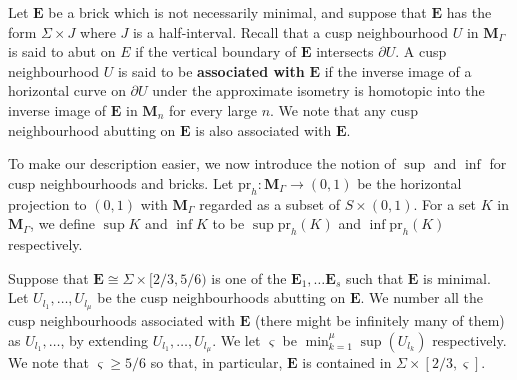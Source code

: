 \documentclass{amsart}
\theoremstyle{definition}
\newcommand{\pr}{\mathrm{pr}}
\begin{document}
Let $\mathbf E$ be a brick  which  is not necessarily minimal, and suppose that $\mathbf E$ has the form $\Sigma \times J$ where $J$ is a half-interval.
Recall that a cusp neighbourhood $U$ in $\mathbf M_\Gamma$ is said to  abut on $E$ if the vertical boundary of $\mathbf E$ intersects $\partial U$.
A cusp neighbourhood $U$ is said to be {\bf associated with} $\mathbf E$ if the inverse image of  a horizontal curve on $\partial U$ under the approximate isometry  is homotopic into the inverse image of $\mathbf E$ in $\mathbf M_n$ for every large $n$.
We note that any cusp neighbourhood abutting on $\mathbf E$ is also associated with $\mathbf E$.

To make our description  easier, we now introduce the notion of $\sup$ and $\inf$ for cusp neighbourhoods and bricks.
Let $\pr_h \colon \mathbf M_\Gamma \to (0,1)$ be the horizontal projection to $(0,1)$ with $\mathbf M_\Gamma$ regarded as a subset of $S \times (0,1)$.
For a set $K$ in $\mathbf M_\Gamma$, we define $\sup K$ and $\inf K$ to be $\sup \pr_h(K)$ and $\inf \pr_h(K)$ respectively.


Suppose that $\mathbf E \cong \Sigma \times [2/3,5/6)$ is one of the  $\mathbf E_1, \dots  \mathbf E_s$ such that $\mathbf E$ is minimal.
Let $U_{l_1}, \dots , U_{l_\mu}$ be the cusp neighbourhoods abutting on $\mathbf E$.
We number all the cusp neighbourhoods associated with $\mathbf E$ (there might be infinitely many of them) as $U_{l_1}, \dots$, by extending $U_{l_1}, \dots , U_{l_\mu}$.
We let $\varsigma$ be $\min_{k=1}^\mu \sup(U_{l_k})$ respectively.
We note that $\varsigma \geq 5/6$ so that, in particular, $\mathbf E$ is contained in $\Sigma \times [2/3, \varsigma]$.
\end{document}
